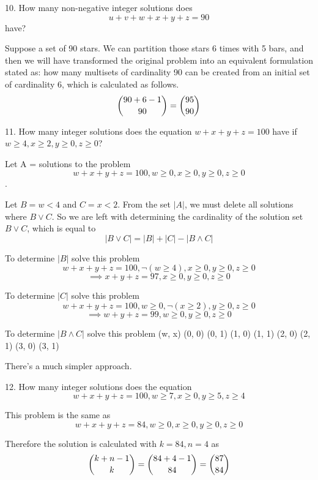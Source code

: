 \documentclass{idrisMemo}
\begin{document}
\begin{prooflist}{10. How many non-negative integer solutions does $$u + v+ w+ x+
    y+ z = 90$$ have?}
\item Suppose a set of 90 stars.  We can partition those stars 6 times with 5
    bars, and then we will have transformed the original problem into an
    equivalent formulation stated as: how many multisets of cardinality 90 can
    be created from an initial set of cardinality 6, which is calculated as
    follows.
    $$ \dbinom{90+6-1}{90} = \dbinom{95}{90}$$
\end{prooflist}

\begin{prooflist}{11. How many integer solutions does the equation
        $w + x + y+ z = 100$ have if $w \geq 4, x \geq 2, y \geq 0, z \geq 0$?}
\item Let A = solutions to the problem
    $$w + x + y+ z = 100, w \geq 0, x \geq 0, y \geq 0, z \geq 0$$.
\item Let $B=w<4$ and $C=x<2$. From the set $|A|$, we must delete all solutions
    where $B\lor C$. So we are left with determining the cardinality of the
    solution set $B \lor C$, which is equal to
    $$
        |B\lor C| = |B| + |C| - |B\land C|
    $$
\item To determine $|B|$ solve this problem
$$w + x + y+ z = 100, \neg(w \geq 4), x \geq 0, y \geq 0, z \geq 0$$
$$\implies x + y+ z = 97, x \geq 0, y \geq 0, z \geq 0$$

\item To determine $|C|$ solve this problem
$$w + x + y+ z = 100, w \geq 0, \neg(x \geq 2), y \geq 0, z \geq 0$$
$$\implies w + y+ z = 99, w \geq 0, y \geq 0, z \geq 0$$

\item To determine $|B\land C|$ solve this problem
    (w, x)
    (0, 0)
    (0, 1)
    (1, 0)
    (1, 1)
    (2, 0)
    (2, 1)
    (3, 0)
    (3, 1)
\item There's a much simpler approach.
\end{prooflist}

\begin{prooflist}{12. How many integer solutions does the equation
        $$w + x + y+ z = 100, w \geq 7, x \geq 0, y \geq 5, z \geq 4$$
    }
\item This problem is the same as
        $$w + x + y+ z = 84, w \geq 0, x \geq 0, y \geq 0, z \geq 0$$
    \item Therefore the solution is calculated with $k=84, n=4$ as
    $$ \dbinom{k+n-1}{k} = \dbinom{84+4-1}{84}=\dbinom{87}{84}$$
\end{prooflist}
\end{document}
